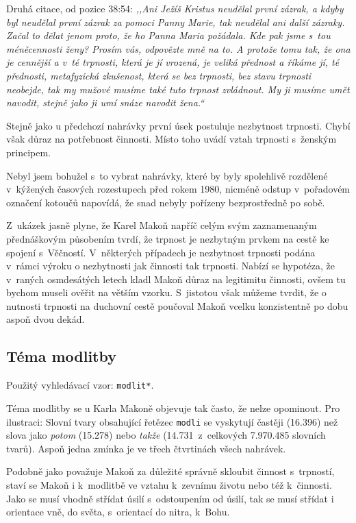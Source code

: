 \begin{enumerate}
{      Druhá citace, od pozice 38:54: \textit{%
        ,,Ani Ježíš Kristus neudělal první zázrak, a kdyby byl neudělal první
        zázrak za pomoci Panny Marie, tak neudělal ani další zázraky. Začal to
        dělat jenom proto, že ho Panna Maria požádala. Kde pak jsme s~tou
        méněcennosti ženy? Prosím vás, odpovězte mně na to. A protože tomu tak,
        že ona je cennější a v~té trpnosti, která je jí vrozená, je veliká
        přednost a říkáme jí, té přednosti, metafyzická zkušenost, která se bez
        trpnosti, bez stavu trpnosti neobejde, tak my mužové musíme také tuto
        trpnost zvládnout. My ji musíme umět navodit, stejně jako ji umí snáze
        navodit žena.``
      }

      Stejně jako u předchozí nahrávky první úsek postuluje nezbytnost trpnosti.
      Chybí však důraz na potřebnost činnosti. Místo toho uvádí vztah trpnosti
      s~ženským principem.
  }
\end{enumerate}

Nebyl jsem bohužel s~to vybrat nahrávky, které by byly spolehlivě rozdělené
v~kýžených časových rozestupech před rokem 1980, nicméně odstup v~pořadovém
označení kotoučů napovídá, že snad nebyly pořízeny bezprostředně po sobě.

Z~ukázek jasně plyne, že Karel Makoň napříč celým svým zaznamenaným přednáškovým
působením tvrdí, že trpnost je nezbytným prvkem na cestě ke spojení s~Věčností.
V~některých případech je nezbytnost trpnosti podána v~rámci výroku o nezbytnosti
jak činnosti tak trpnosti. Nabízí se hypotéza, že v~raných osmdesátých letech
kladl Makoň důraz na legitimitu činnosti, ovšem tu bychom museli ověřit na
větším vzorku. S~jistotou však můžeme tvrdit, že o nutnosti trpnosti na duchovní
cestě poučoval Makoň vcelku konzistentně po dobu aspoň dvou dekád.

\subsection{Téma modlitby}

Použitý vyhledávací vzor: \texttt{modlit*}.

Téma modlitby se u Karla Makoně objevuje tak často, že nelze opominout. Pro
ilustraci: Slovní tvary obsahující řetězec \texttt{modli} se vyskytují častěji
(16.396\texttimes) než slova jako \textit{potom} (15.278\texttimes) nebo
  \textit{takže} (14.731\texttimes~z~celkových 7.970.485 slovních tvarů). Aspoň
jedna zmínka je ve třech čtvrtinách všech nahrávek.

Podobně jako považuje Makoň za důležité správně skloubit činnost s~trpností,
staví se Makoň i k~modlitbě ve vztahu k~zevnímu životu nebo též k~činnosti. Jako
se musí vhodně střídat úsilí s~odstoupením od úsilí, tak se musí střídat i
orientace vně, do světa, s~orientací do nitra, k~Bohu.


